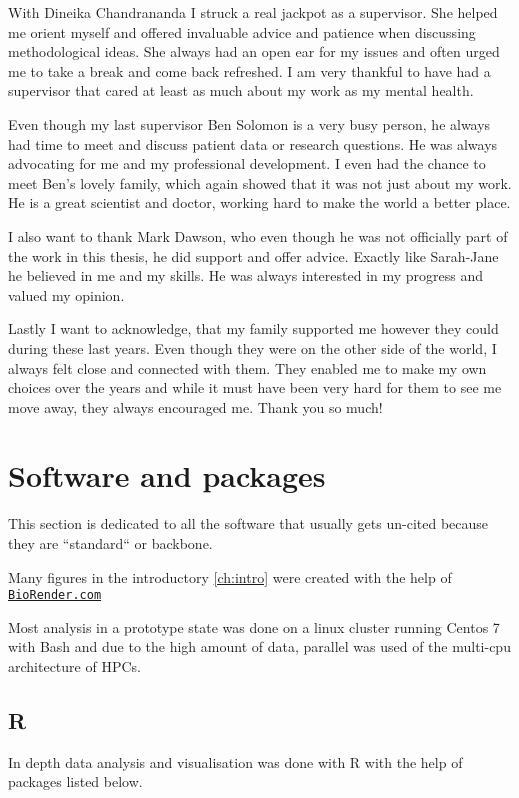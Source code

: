 {With Dineika Chandrananda I struck a real jackpot as a supervisor. She helped me orient myself and offered invaluable advice and patience when discussing methodological ideas. She always had an open ear for my issues and often urged me to take a break and come back refreshed. I am very thankful to have had a supervisor that cared at least as much about my work as my mental health.

Even though my last supervisor Ben Solomon is a very busy person, he always had time to meet and discuss patient data or research questions. He was always advocating for me and my professional development. I even had the chance to meet Ben's lovely family, which again showed that it was not just about my work. He is a great scientist and doctor, working hard to make the world a better place.

I also want to thank Mark Dawson, who even though he was not officially part of the work in this thesis, he did support and offer advice. Exactly like Sarah-Jane he believed in me and my skills. He was always interested in my progress and valued my opinion.

Lastly I want to acknowledge, that my family supported me however they could during these last years. Even though they were on the other side of the world, I always felt close and connected with them. They enabled me to make my own choices over the years and while it must have been very hard for them to see me move away, they always encouraged me. Thank you so much!



\section*{Software and packages} 

This section is dedicated to all the software that usually gets un-cited because they are ``standard`` or backbone.

Many figures in the introductory \autoref{ch:intro} were created with the help of \href{https://BioRender.com}{\nolinkurl{BioRender.com}} 


Most analysis in a prototype state was done on a linux cluster running Centos 7 \cite{CentosProject2014} with Bash \cite{FSF2007} and due to the high amount of data, parallel \cite{Tange2011} was used of the multi-cpu architecture of HPCs.

\subsection*{R}
In depth data analysis and visualisation was done with R \cite{RCT2021} with the help of packages listed below.


}
